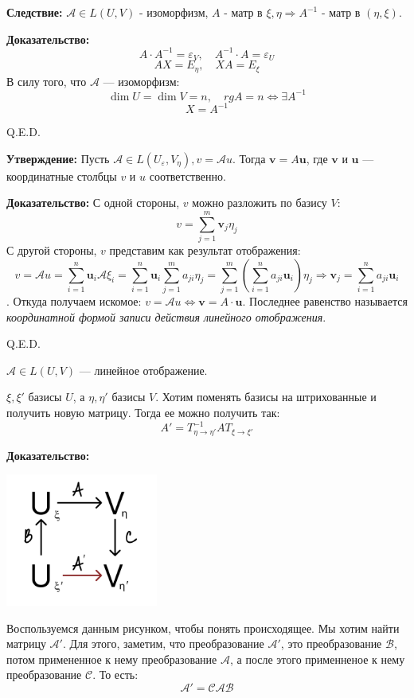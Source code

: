 \textbf{Следствие:} $\mathcal{A} \in L(U,V)$ - изоморфизм, $A$ - матр в $\xi,\eta \Rightarrow A^{-1}$ - матр в $(\eta, \xi)$.

\textbf{Доказательство:}
$$A \cdot A^{-1} = \varepsilon_V, \quad A^{-1} \cdot A = \varepsilon_U$$
$$AX = E_{\eta}, \quad XA = E_{\xi}$$
В силу того, что $\mathcal{A}$ --- изоморфизм:
$$\dim U = \dim V = n, \quad rgA = n \Leftrightarrow \exists A^{-1}$$
$$X = A^{-1}$$

\hfill Q.E.D.

\textbf{Утверждение:}
Пусть $\mathcal{A} \in L(U_{\varepsilon}, V_{\eta}), v = \mathcal{A}u$.
Тогда $\mathbf{v} = A\mathbf{u}$, где $\mathbf{v}$ и $\mathbf{u}$ --- координатные столбцы $v$ и $u$ соответственно.


\textbf{Доказательство:}
С одной стороны, $v$ можно разложить по базису $V$:
$$v = \sum\limits_{j = 1}^{m} \mathbf{v}_j\eta_j$$
С другой стороны, $v$ представим как результат отображения:
$$v = \mathcal{A}u = \sum\limits_{i=1}^n \mathbf{u}_i \mathcal{A} \xi_i = \sum\limits_{i=1}^n \mathbf{u}_i \sum\limits_{j=1}^ma_{ji} \eta_j = \sum\limits_{j=1}^m (\sum\limits_{i=1}^na_{ji}\mathbf{u}_i)\eta_j  \Rightarrow \mathbf{v}_j =\sum\limits_{i=1}^na_{ji}\mathbf{u}_i$$.
Откуда получаем искомое: $v = \mathcal{A} u \Leftrightarrow \mathbf{v} = A \cdot \mathbf{u}$. Последнее равенство называется \emph{координатной формой записи действия линейного отображения}.

\hfill Q.E.D.


$\mathcal{A} \in L(U,V)$ --- линейное отображение.

$\xi,\xi'$ базисы $U$, а $\eta, \eta'$ базисы $V$. Хотим поменять базисы на штрихованные и получить новую матрицу. Тогда ее можно получить так:
$$A' = T^{-1}_{\eta \rightarrow \eta'} A T_{\xi\rightarrow \xi'}$$

\textbf{Доказательство:}

\begin{center}
    \includegraphics[width = 5cm]{assets/7_2_1.png}
\end{center}
    Воспользуемся данным рисунком, чтобы понять происходящее. Мы хотим найти матрицу $\mathcal{A}'$. Для этого, заметим, что преобразование $\mathcal{A}'$, это преобразование $\mathcal{B}$, потом примененное к нему преобразование $\mathcal{A}$, а после этого применненое к нему преобразование $\mathcal{C}$. То есть:
    $$\mathcal{A}'=\mathcal{C}\mathcal{A}\mathcal{B}$$

